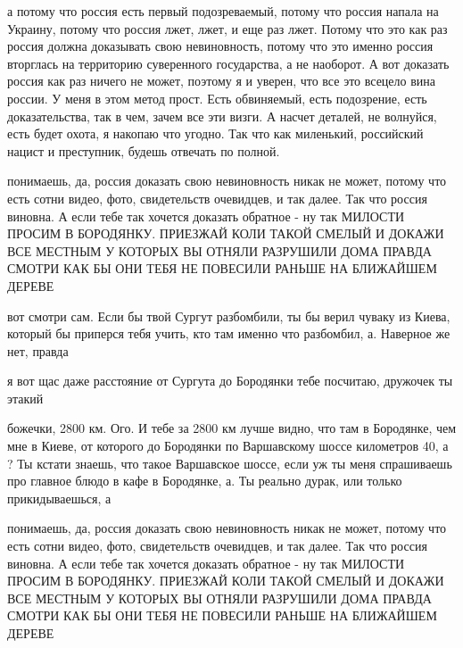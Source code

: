  
 
 
 
 

а потому что россия есть первый подозреваемый, потому что россия напала на
Украину, потому что россия лжет, лжет, и еще раз лжет. Потому что это как раз
россия должна доказывать свою невиновность, потому что это именно россия
вторглась на территорию суверенного государства, а не наоборот. А вот доказать
россия как раз ничего не может, поэтому я и уверен, что все это всецело вина
россии. У меня в этом метод прост. Есть обвиняемый, есть подозрение, есть
доказательства, так в чем, зачем все эти визги. А насчет деталей, не волнуйся,
есть будет охота, я накопаю что угодно. Так что как миленький, российский
нацист и преступник, будешь отвечать по полной.

понимаешь, да, россия доказать свою невиновность никак не может, потому что
есть сотни видео, фото, свидетельств очевидцев, и так далее. Так что россия
виновна. А если тебе так хочется доказать обратное - ну так МИЛОСТИ ПРОСИМ В
БОРОДЯНКУ. ПРИЕЗЖАЙ КОЛИ ТАКОЙ СМЕЛЫЙ И ДОКАЖИ ВСЕ МЕСТНЫМ У КОТОРЫХ ВЫ ОТНЯЛИ
РАЗРУШИЛИ ДОМА ПРАВДА СМОТРИ КАК БЫ ОНИ ТЕБЯ НЕ ПОВЕСИЛИ РАНЬШЕ НА БЛИЖАЙШЕМ
ДЕРЕВЕ

вот смотри сам. Если бы твой Сургут разбомбили, ты бы верил чуваку из Киева,
который бы приперся тебя учить, кто там именно что разбомбил, а. Наверное же
нет, правда

я вот щас даже расстояние от Сургута до Бородянки тебе посчитаю, дружочек ты
этакий

божечки, 2800 км. Ого. И тебе за 2800 км лучше видно, что там в Бородянке, чем
мне в Киеве, от которого до Бородянки по Варшавскому шоссе километров 40, а ?
Ты кстати знаешь, что такое Варшавское шоссе, если уж ты меня спрашиваешь про
главное блюдо в кафе в Бородянке, а. Ты реально дурак, или только
прикидываешься, а

понимаешь, да, россия доказать свою невиновность никак не может, потому что
есть сотни видео, фото, свидетельств очевидцев, и так далее. Так что россия
виновна. А если тебе так хочется доказать обратное - ну так МИЛОСТИ ПРОСИМ В
БОРОДЯНКУ. ПРИЕЗЖАЙ КОЛИ ТАКОЙ СМЕЛЫЙ И ДОКАЖИ ВСЕ МЕСТНЫМ У КОТОРЫХ ВЫ ОТНЯЛИ
РАЗРУШИЛИ ДОМА ПРАВДА СМОТРИ КАК БЫ ОНИ ТЕБЯ НЕ ПОВЕСИЛИ РАНЬШЕ НА БЛИЖАЙШЕМ
ДЕРЕВЕ

